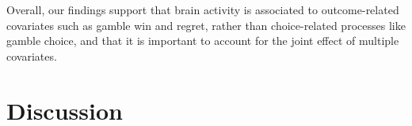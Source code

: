Overall, our findings support that brain activity is associated to outcome-related covariates such as gamble win and regret, rather than choice-related processes like gamble choice, and that it is important to account for the joint effect of multiple covariates.






\section{Discussion}
\label{sec:discussion}


